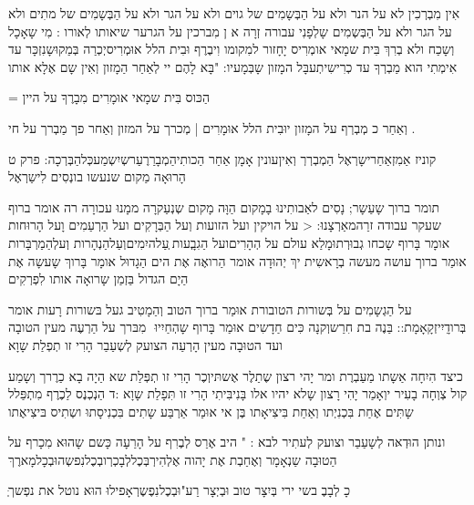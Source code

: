 \documentclass[14pt, a5paper, twoside, extrafontsizes]{memoir}
\begin{document}
\begin{hebrew}
\hdot
 אִין מִבְרְכִין לא על הנר ולא על הַבְּשָמִים
של גוים \hdot
 ולא על הגר ולא על הַבְּשָמִים של
מתִים \hdot
 ולא על הגר ולא על הַבְּשְמִים שָלְפָנִי
עבורה זְרָה \hdot
א\hdot
ן מִברכין על הגרער שיאותו
לְאורו : \hdot
 מִי שָאָכָל וְשָכַח ולא בְרִךְ \hdot
 בִּית
שמָאי אומְרִיס יָחָזור למִקומו וִיבֶרֶף \hdot
 וּבִית
הלל אוּמְרִיסיְכְרַה בְּמַקוּשָנִזְכָּר\hdot
 עד אִימְתִי
הוא מַבְרְךָ\hdot
עד כְרִישִיתְעבָּל המָזון שָבְּמָעיו:
"בָּא לָהֶם יי לְאַחַר הַמָזון וְאִין שָם אֶלָא אותו

= הַכּוס \hdot
 בִּית שמָאי אוּמָרִים מִבָרֶךָ על היין \hdot

\hdot
 וְאַחַר כ מְבְרְף על המָזון יוּבִית הלל אוּמָרִים
| מְכרך על המזון וְאַחר פך מַבְרך על חי \hdot
.

קוניז אַמִזְאַחַרישָרְאֶל הַמְבְרְרְ וְאִיןעונין אָמָן
אַחַר הַכותִיהַמְבָרַרֶעַרשְיִשְמַעכְּלהַבְּרְכָה:
פרק ט הָרוּאָה מַקום שנעשו בונְסִים לִישַרְאֶל\hdot


תומר ברוך שָעַשָר; נָסִים לאַבותִינוּ
בָמָקום הַוָּה \hdot
 מָקום שְנְעַקרָה ממָנוּ עכורָה
רה \hdot
 אומר ברוף שעקר עבודה זרַהמאַרְצָנוּ:
< על הויקין ועל הזועות וְעל הַבְּרָקִים ועל
הַרְעַמִים וָעל הָרוּחות \hdot
 אומָר בָּרוף שָכחו
גְבוּרְתוּמָלַא עולם\hdot
 על הְהָרִיםועל הַגִבְָעות
ְעַלהיִמִיםוְעַלהַנְהָרות וְעלְהַמַרְבָּרות\hdot
 אוּמַר
ברוך עושה מעשה בְרָאשִית יךְ\hdot
 יְהוּדָה אומר
הַרואֶה אֶת הים הַגָדוּל אומָר בָּרוךּ שָעשָה
אֶת הַיָם הגדול בַּזְמַן שָרואָה אותו לִפְרְקִים \hdot

על הַגְשָמִים על בְּשורות הטובורת אוּמַר
ברוך הטוב וְהַמָטִיב \hdot
 געל בּשורות רָעות
אומר בְּרודִָיִיזְקָאָמָת:: בַּנֶה בת חִרַשוְקנָה
כִּים חַדָשִים \hdot
 אוּמַר בָּרוף שָהְחַיִיוּ ‏ מִבּרך
על הַרְעֶה מעין הטובָה \hdot
 ועד הטוּבָה מעין
הָרְעַה \hdot
 הצועק לְשְעַבַר הָרִי זו תְפְלַת שָוָא \hdot

כיצד \hdot
 הִיִחָה אַשָתו מַעַבְרֶת ומר יָהי רצון
שֶתַלֶר אֶשתּיוְכֶר \hdot
 הָרִי זו תְפְּלַת שא \hdot
 הַיָה
בָא כַרֶרך וְשָמַע קול צְוְחָה בָעִיר יוְאָמַר יָהִי
רָצון שָלא יהיו אלו בָּנִיבִּיתִי הָרִי זו תִּפָלַת
שָוָא :ד הַנְכְנֶס לַכֶרֶף מִתְפַּלל שָתִּים \hdot
 אֶחַת
בִּכְנִיְתו \hdot
 וְאַחַת בִּיצִיאָתו \hdot
 בֶּן אי אוּמַר
אַרְבַּע \hdot
 שָתִים בִּכְנִיסָתוּ \hdot
 ושְתִיס בּיצִיאֶתו \hdot

ונותן הוּדְאּה לְשָעַבַר \hdot
 וצועק לְעתִיר לבא :
" היב אֶרַס לְבֶרִף על הָרַעָה כָּשם שָהוּא
מִכָרף על הַטוּבָה שַנְאָמָר וְאֶחַבְת אֶת יָהוה
אֶלְהִירְבְּכֶללְבָכְרְובְכֶלנִפשְהוּבְכָלמָארֶךּ\hdot

ְּכָ לְבָבֶ\hdot
 בשי ירי \hdot
 בְּיִצָר טוב וּבְיְצָר
רַע"וּבְכֶלנִפֶשֶרְאָפילוּ הוּא נוטל את נפְשך\hdot


\end{hebrew}
\end{document}
